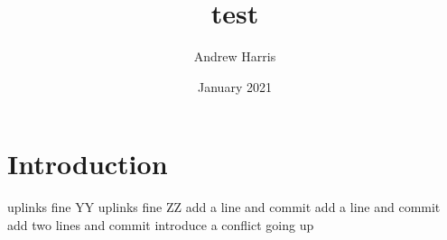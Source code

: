 \documentclass{article}
\title{test}
\author{Andrew Harris}
\date{January 2021}
\begin{document}
\maketitle

\section{Introduction}
uplinks fine YY
uplinks fine ZZ
add a line and commit
add a line and commit
add two lines and commit
introduce a conflict going up
\end{document}
